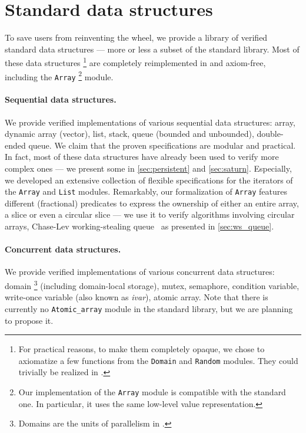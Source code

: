 \section{Standard data structures}
\label{sec:std}

To save users from reinventing the wheel, we provide a library of verified standard data structures --- more or less a subset of the \OCaml standard library.
Most of these data structures%
\footnote{
For practical reasons, to make them completely opaque, we chose to axiomatize a few functions from the \texttt{Domain} and \texttt{Random} modules.
They could trivially be realized in \Zoo.
}
are completely reimplemented in \Zoo and axiom-free, including the \texttt{Array}%
\footnote{
Our implementation of the \texttt{Array} module is compatible with the standard one.
In particular, it uses the same low-level value representation.
}
module.

\paragraph{Sequential data structures.}

We provide verified implementations of various sequential data structures: array, dynamic array (vector), list, stack, queue (bounded and unbounded), double-ended queue.
We claim that the proven specifications are modular and practical.
In fact, most of these data structures have already been used to verify more complex ones --- we present some in \cref{sec:persistent} and \cref{sec:saturn}.
Especially, we developed an extensive collection of flexible specifications for the iterators of the \texttt{Array} and \texttt{List} modules.
Remarkably, our formalization of \texttt{Array} features different (fractional) predicates to express the ownership of either an entire array, a slice or even a circular slice --- we use it to verify algorithms involving circular arrays, \eg Chase-Lev working-stealing queue~\citep*{DBLP:conf/spaa/ChaseL05} as presented in \cref{sec:ws_queue}.

\paragraph{Concurrent data structures.}

We provide verified implementations of various concurrent data structures: domain%
\footnote{
Domains are the units of parallelism in \OCamlFive.
}
(including domain-local storage), mutex, semaphore, condition variable, write-once variable (also known as \emph{ivar}), atomic array.
Note that there is currently no \texttt{Atomic\_array} module in the \OCaml standard library, but we are planning to propose it.

